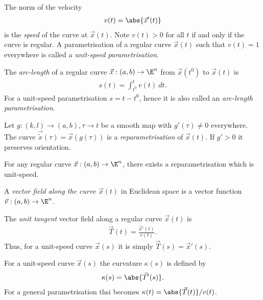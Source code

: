 \documentclass{article}
\begin{document}
\begin{definition}
    The norm of the velocity
    \begin{align*}
        v(t)=\abs{\vec x'(t)}
    \end{align*}
    is the \emph{speed} of the curve at $\vec x(t)$. Note $v(t)>0$ for all $t$
    if and only if the curve is regular. A parametrisation of a regular curve $\vec x(t)$
    such that $v(t)=1$ everywhere is called a \emph{unit-speed parametrisation}.
\end{definition}

\begin{definition}
    The \emph{arc-length} of a regular curve $\vec x:(a,b)\to \E^n$ from $\vec x(t^0)$
    to $\vec x(t)$ is
    \begin{align*}
        s(t) = \int_{t^0}^t v(t)\:dt.
    \end{align*}
    For a unit-speed parametrisation $s=t-t^0$, hence it is also called an
    \emph{arc-length parametrisation}.
\end{definition}

\begin{definition}
    Let $g:(k,l)\to(a,b), \tau\to t$ be a smooth map with $g'(\tau)\not=0$ everywhere.
    The curve $\vec{\tilde x}(\tau)=\vec x(g(\tau))$ is a \emph{reparametrisation}
    of $\vec x(t)$. If $g'>0$ it preserves orientation.
\end{definition}

\begin{theorem}
    For any regular curve $\vec x:(a,b)\to\E^n$, there exists a reparametrisation
    which is unit-speed.
\end{theorem}

\begin{definition}
    A \emph{vector field along the curve $\vec x(t)$} in Euclidean space is a vector
    function $\vec v:(a,b)\to\E^n$.
\end{definition}

\begin{definition}
    The \emph{unit tangent} vector field along a regular curve $\vec x(t)$ is 
    \begin{align*}
        \vec T(t) = \frac{\vec x'(t)}{v(t)}.
    \end{align*}
    Thus, for a unit-speed curve $\vec x(s)$ it is simply $\vec T(s)=\vec x'(s)$.
\end{definition}

\begin{definition}
    For a unit-speed curve $\vec x(s)$ the curvature $\kappa(s)$ is defined by
    \begin{align*}
        \kappa(s) = \abs{\vec T'(s)}.
    \end{align*}
    For a general parametrisation thsi becomes $\kappa(t)=\abs{\vec T(t)}/v(t)$.
\end{definition}
\end{document}
